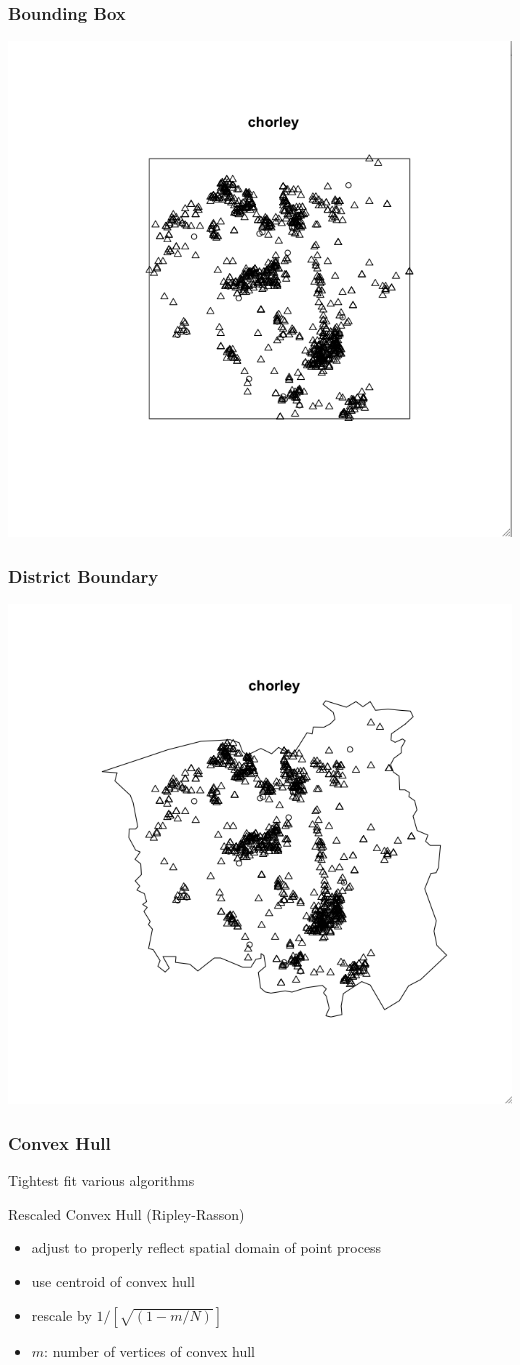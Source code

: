 \documentclass[nototal]{beamer}
\begin{document}
    \begin{frame}
      \frametitle{Bounding Box}
      \begin{center}
	\includegraphics[width=.65\linewidth]{chorleybb.png}
      \end{center}
    \end{frame}

    \begin{frame}
      \frametitle{District Boundary}
      \begin{center}
	\includegraphics[width=.65\linewidth]{chorleypoly.png}
      \end{center}
    \end{frame}

    \begin{frame}
      \frametitle{Convex Hull}
      \begin{block}{Tightest fit}
	 various algorithms
       \end{block}
       \begin{block}{Rescaled Convex Hull (Ripley-Rasson)}
	\begin{itemize}
	  \item adjust to properly reflect spatial domain of point process
	  \item use centroid of convex hull
	  \item rescale by $1/[\sqrt{(1-m/N)}]$
	  \item $m$: number of vertices of convex hull
	\end{itemize}
       \end{block}
     \end{frame}
\end{document}
